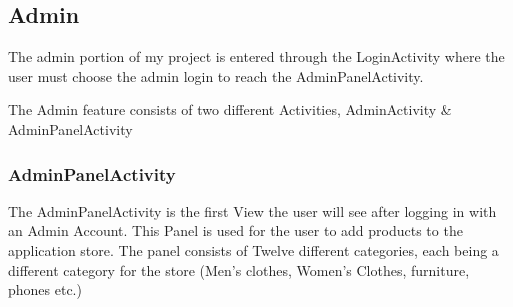 \subsection{Admin}

The admin portion of my project is entered through the LoginActivity where the user must choose the admin login to reach the AdminPanelActivity.\newline

The Admin feature consists of two different Activities, AdminActivity \& AdminPanelActivity

\subsubsection{AdminPanelActivity}
The AdminPanelActivity is the first View the user will see after logging in with an Admin Account. This Panel is used for the user to add products to the application store. The panel consists of Twelve different categories, each being a different category for the store (Men's clothes, Women's Clothes, furniture, phones etc.)

